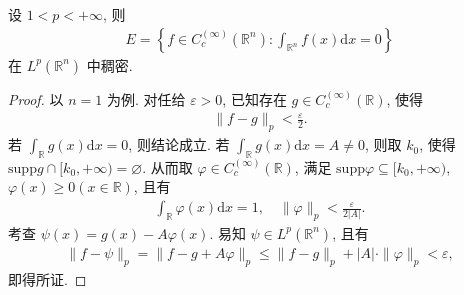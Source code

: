 \documentclass[../../main.tex]{subfiles}%
\begin{document}
\begin{example}
设 $1<p<+\infty$, 则
\begin{align*}
E = \left\{ f\in C_c^{(\infty)}(\mathbb{R}^n): \int_{\mathbb{R}^n} f(x) \mathrm{d}x=0 \right\}
\end{align*}
在 $L^p(\mathbb{R}^n)$ 中稠密.
\end{example}
\begin{proof}
以 $n=1$ 为例. 对任给 $\varepsilon>0$, 已知存在 $g\in C_c^{(\infty)}(\mathbb{R})$, 使得
\begin{align*}
\|f-g\|_p <\frac{ \varepsilon}{2}.
\end{align*}
若 $\int_{\mathbb{R}} g(x) \mathrm{d}x=0$, 则结论成立. 若 $\int_{\mathbb{R}} g(x) \mathrm{d}x=A\neq 0$, 则取 $k_0$, 使得 $\mathrm{supp}g\cap [k_0,+\infty)=\varnothing$. 从而取 $\varphi\in C_c^{(\infty)}(\mathbb{R})$, 满足 $\mathrm{supp}\varphi\subseteq [k_0,+\infty)$, $\varphi(x)\geqslant 0(x\in \mathbb{R})$, 且有
\begin{align*}
\int_{\mathbb{R}} \varphi(x) \mathrm{d}x=1, \quad \|\varphi\|_p < \frac{\varepsilon}{2|A|}.
\end{align*}
考查 $\psi(x)=g(x)-A\varphi(x)$. 易知 $\psi\in L^p(\mathbb{R}^n)$, 且有
\begin{align*}
\|f-\psi\|_p = \|f-g+A\varphi\|_p 
\leqslant \|f-g\|_p + |A|\cdot \|\varphi\|_p < \varepsilon,
\end{align*}
即得所证.
\end{proof}
\end{document}
